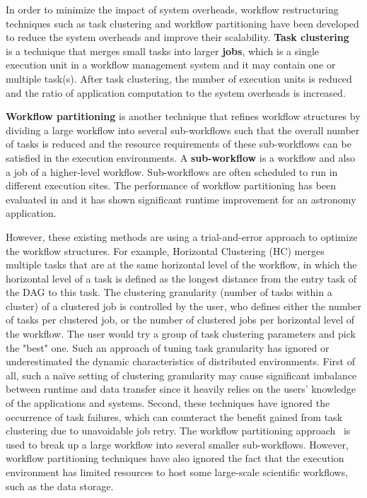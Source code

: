 In order to minimize the impact of system overheads, workflow restructuring techniques such as task clustering \cite{Singh2008,Hussin2010,Zhao2009} and workflow partitioning \cite{Kumar2002, Hedayat2009} have been developed to reduce the system overheads and improve their scalability. \textbf{Task clustering}~\cite{Singh2008} is a technique that merges small tasks into larger \textbf{jobs}, which is a single execution unit in a workflow management system and it may contain one or multiple task(s). After task clustering, the number of execution units is reduced and the ratio of application computation to the system overheads is increased. 


\textbf{Workflow partitioning} is another technique that refines workflow structures by dividing a large workflow into several sub-workflows such that the overall number of tasks is reduced and the resource requirements of these sub-workflows can be satisfied in the execution environments. A \textbf{sub-workflow} is a workflow and also a job of a higher-level workflow. Sub-workflows are often scheduled to run in different execution sites. The performance of workflow partitioning has been evaluated in \cite{Rynge2012} and it has shown significant runtime improvement for an astronomy application. 
 
However, these existing methods are using a trial-and-error approach to optimize the workflow structures. For example, Horizontal Clustering (HC) \cite{Singh2008} merges multiple tasks that are at the same horizontal level of the workflow, in which the horizontal level of a task is defined as the longest distance from the entry task of the DAG to this task. The clustering granularity (number of tasks within a cluster) of a clustered job is controlled by the user, who defines either the number of tasks per clustered job, or the number of clustered jobs per horizontal level of the workflow. The user would try a group of task clustering parameters and pick the "best" one. Such an approach of tuning task granularity has ignored or underestimated the dynamic characteristics of distributed environments. First of all, such a na\"{i}ve setting of clustering granularity may cause significant imbalance between runtime and data transfer since it heavily relies on the users' knowledge of the applications and systems. Second, these techniques have ignored the occurrence of task failures, which can counteract the benefit gained from task clustering due to unavoidable job retry. The workflow partitioning approach~\cite{Rynge2012} is used to break up a large workflow into several smaller sub-workflows. However, workflow partitioning techniques have also ignored the fact that the execution environment has limited resources to host some large-scale scientific workflows, such as the data storage. 

